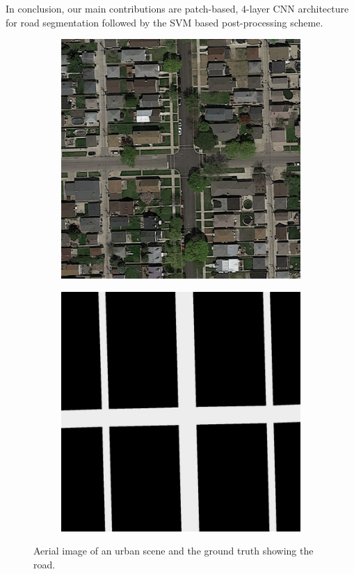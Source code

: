 \documentclass[10pt,conference,compsocconf]{IEEEtran}
\begin{document}
In conclusion, our main contributions are patch-based, \mbox{4-layer} CNN architecture for road segmentation followed by the SVM based post-processing scheme. 

\begin{figure}[]
	\centering
	\begin{subfigure}{.2\textwidth}
		\includegraphics[width=1\textwidth]{figs/img1.png}
	\end{subfigure}
	\begin{subfigure}{.2\textwidth}
		\includegraphics[width=1\textwidth]{figs/groundtruth1.png}
	\end{subfigure}
	\caption{Aerial image of an urban scene and the ground truth showing the road.}
\end{figure}
\end{document}
